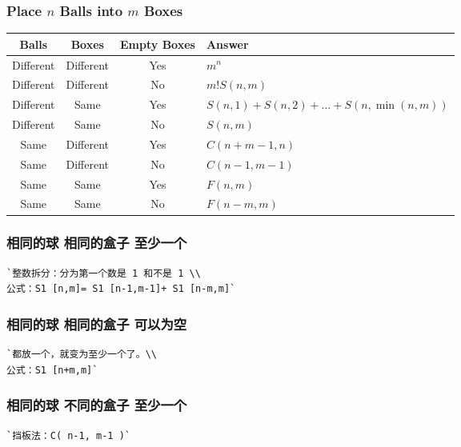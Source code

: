 \documentclass[a4paper]{article}
\begin{document}
\begin{CJK*}{UTF8}{gbsn}
\begin{multicols}{3}
\begin{flushleft}
\subsubsection{Place $n$ Balls into $m$ Boxes}
\begin{table}[h]
\scriptsize
    \begin{tabular}{|c|c|c|l|}
        \hline
        Balls & Boxes & Empty Boxes & Answer \\ \hline
        Different & Different & Yes & $m^n$ \\ \hline
        Different & Different & No & $m!S\left( {n,m} \right)$ \\ \hline
        Different & Same & Yes & $S\left( {n,1} \right) + S\left( {n,2} \right) +  \ldots  + S\left( {n,\min \left( {n,m} \right)} \right)$ \\ \hline
        Different & Same & No & $S\left( {n,m} \right)$ \\ \hline
        Same & Different & Yes & $C\left( {n + m - 1,n} \right)$ \\ \hline
        Same & Different & No & $C\left( {n - 1,m - 1} \right)$ \\ \hline
        Same & Same & Yes & $F\left( {n,m} \right)$ \\ \hline
        Same & Same & No & $F\left( {n - m,m} \right)$ \\
        \hline
    \end{tabular}
\end{table}


\subsubsection{相同的球 相同的盒子 至少一个}
\begin{lstlisting}
`整数拆分：分为第一个数是 1 和不是 1 \\
公式：S1 [n,m]= S1 [n-1,m-1]+ S1 [n-m,m]`
\end{lstlisting}

\subsubsection{相同的球 相同的盒子 可以为空}
\begin{lstlisting}
`都放一个，就变为至少一个了。\\
公式：S1 [n+m,m]`
\end{lstlisting}

\subsubsection{相同的球 不同的盒子 至少一个}
\begin{lstlisting}
`挡板法：C( n-1, m-1 )`
\end{lstlisting}


\end{flushleft}
\end{multicols}
\end{CJK*}
\end{document}
